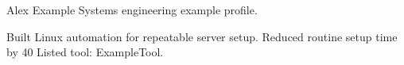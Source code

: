 Alex Example
Systems engineering example profile.

Built Linux automation for repeatable server setup.
Reduced routine setup time by 40%
Listed tool: ExampleTool.
